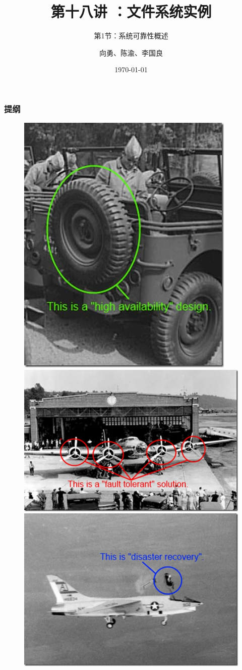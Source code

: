 


\title[第18讲]{第十八讲 ：文件系统实例} %
\subtitle{第1节：系统可靠性概述}
\author{向勇、陈渝、李国良} %
\date{\today} %



\begin{frame}
\titlepage %
\end{frame}

\begin{frame}
\frametitle{提纲} %
\tableofcontents %

\begin{figure}
\includegraphics[width=0.2\linewidth]{figs/ha.jpg}
\includegraphics[width=0.37\linewidth]{figs/ft.jpg}
\includegraphics[width=0.33\linewidth]{figs/dr.jpg}
\end{figure}
\end{frame}
